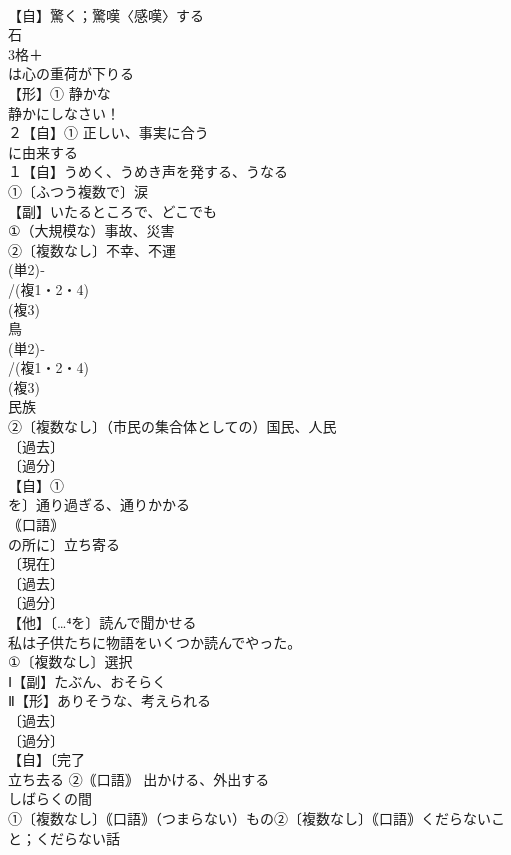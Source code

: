 \documentclass[8pt]{extreport}
\begin{document}
\begin{CJK}{UTF8}{min}
\\	【自】驚く；驚嘆〈感嘆〉する
\\	石 
\\	3格＋
\\	は心の重荷が下りる
\\	【形】① 静かな 
\\	静かにしなさい！
\\	２【自】① 正しい、事実に合う 
\\	に由来する
\\	１【自】うめく、うめき声を発する、うなる 
\\	①〔ふつう複数で〕涙 
\\	【副】いたるところで、どこでも 
\\	①（大規模な）事故、災害 
\\	②〔複数なし〕不幸、不運
\\	(単2)‐
\\	/(複1・2・4)
\\	(複3)
\\	鳥 
\\	(単2)‐
\\	/(複1・2・4)
\\	(複3)
\\	民族 
\\	②〔複数なし〕（市民の集合体としての）国民、人民
\\	〔過去〕
\\	〔過分〕
\\	【自】①
\\	を〕通り過ぎる、通りかかる 
\\	｟口語｠
\\	の所に〕立ち寄る
\\	〔現在〕
\\	〔過去〕
\\	〔過分〕
\\	【他】〔…⁴を〕読んで聞かせる 
\\	私は子供たちに物語をいくつか読んでやった。
\\	①〔複数なし〕選択
\\	Ⅰ【副】たぶん、おそらく 
\\	Ⅱ【形】ありそうな、考えられる
\\	〔過去〕
\\	〔過分〕
\\	【自】〔完了
\\	立ち去る ②｟口語｠ 出かける、外出する
\\	しばらくの間 
\\	①〔複数なし〕｟口語｠（つまらない）もの②〔複数なし〕｟口語｠くだらないこと；くだらない話 

\end{CJK}
\end{document}
